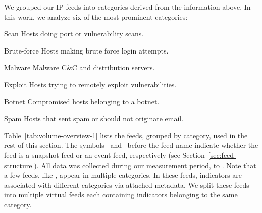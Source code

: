 We grouped our IP feeds into categories derived from the information
above. In this work, we analyze six of the most prominent categories:
%
\begin{categorylist}\small
\item[Scan] Hosts doing port or vulnerability scans.
\item[Brute-force] Hosts making brute force login attempts.
\item[Malware] Malware C\&C and distribution servers.
\item[Exploit] Hosts trying to remotely exploit vulnerabilities.
\item[Botnet] Compromised hosts belonging to a botnet.
\item[Spam] Hosts that sent spam or should not originate email.
\end{categorylist}
%
Table~\ref{tab:volume-overview-1} lists the feeds, grouped by category, used in the
rest of this section. The symbols \snapfeedsym\ and \deltafeedsym\ before the feed
name indicate whether the feed is a snapshot feed or an event feed, respectively
(see Section~\ref{sec:feed-structure}).
All data was collected during our measurement period,
 to . Note that a few
feeds, like {\feedetiprep}, appear in multiple categories. In these feeds, indicators
are associated with different categories via attached metadata. We split these feeds
into multiple virtual feeds each containing indicators belonging to the same category.










%
%

